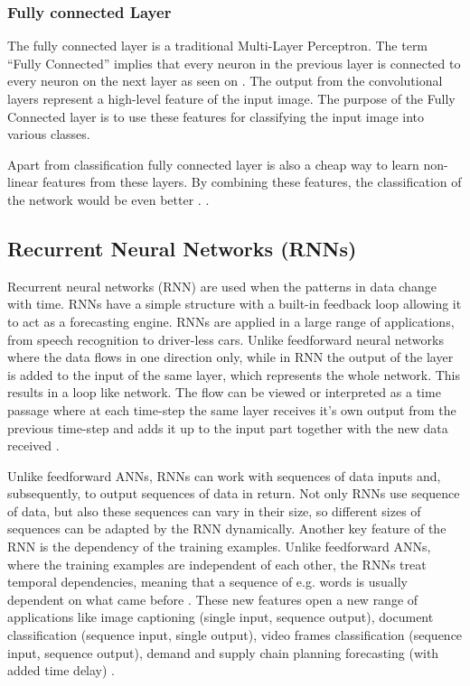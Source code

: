\subsubsection{Fully connected Layer}
The fully connected layer is a traditional Multi-Layer Perceptron. The term “Fully Connected” implies that every neuron in the previous layer is connected to every neuron on the next layer as seen on . The output from the convolutional layers represent a high-level feature of the input image. The purpose of the Fully Connected layer is to use these features for classifying the input image into various classes. 

Apart from classification fully connected layer is also a cheap way to learn non-linear features from these layers. By combining these features, the classification of the network would be even better \cite{Fully_Connected_Layer}.
.

\subsection{Recurrent Neural Networks (RNNs)} \label{RNN}
Recurrent neural networks (RNN) are used when the patterns in data change with time. RNNs have a simple structure with a built-in feedback loop allowing it to act as a forecasting engine. RNNs are applied in a large range of applications, from speech recognition to driver-less cars. Unlike feedforward neural networks where the data flows in one direction only, while in RNN the output of the layer is added to the input of the same layer, which represents the whole network. This results in a loop like network. The flow can be viewed or interpreted as a time passage where at each time-step the same layer receives it's own output from the previous time-step and adds it up to the input part together with the new data received \cite{RNNvideo}. 

Unlike feedforward ANNs, RNNs can work with sequences of data inputs and, subsequently, to output sequences of data in return. Not only RNNs use sequence of data, but also these sequences can vary in their size, so different sizes of sequences can be adapted by the RNN dynamically. Another key feature of the RNN is the dependency of the training examples. Unlike feedforward ANNs, where the training examples are independent of each other, the RNNs treat temporal dependencies, meaning that a sequence of e.g. words is usually dependent on what came before \cite{NeonRNN}. These new features open a new range of applications like image captioning (single input, sequence output), document classification (sequence input, single output), video frames classification (sequence input, sequence output), demand and supply chain planning forecasting (with added time delay) \cite{RNNvideo}.

